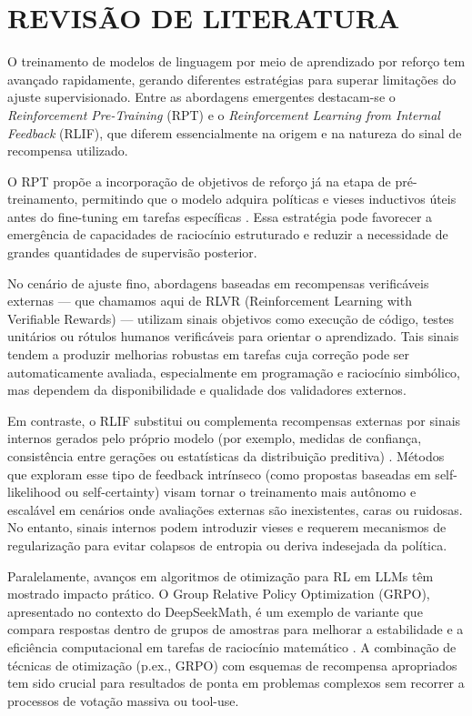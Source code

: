 \documentclass[11pt,a4paper]{article}
\begin{document}
\section{REVISÃO DE LITERATURA}

O treinamento de modelos de linguagem por meio de aprendizado por reforço tem avançado rapidamente, gerando diferentes estratégias para superar limitações do ajuste supervisionado. Entre as abordagens emergentes destacam-se o \textit{Reinforcement Pre-Training} (RPT) e o \textit{Reinforcement Learning from Internal Feedback} (RLIF), que diferem essencialmente na origem e na natureza do sinal de recompensa utilizado.

O RPT propõe a incorporação de objetivos de reforço já na etapa de pré-treinamento, permitindo que o modelo adquira políticas e vieses inductivos úteis antes do fine-tuning em tarefas específicas \cite{dong2025rpt}. Essa estratégia pode favorecer a emergência de capacidades de raciocínio estruturado e reduzir a necessidade de grandes quantidades de supervisão posterior.

No cenário de ajuste fino, abordagens baseadas em recompensas verificáveis externas — que chamamos aqui de RLVR (Reinforcement Learning with Verifiable Rewards) — utilizam sinais objetivos como execução de código, testes unitários ou rótulos humanos verificáveis para orientar o aprendizado. Tais sinais tendem a produzir melhorias robustas em tarefas cuja correção pode ser automaticamente avaliada, especialmente em programação e raciocínio simbólico, mas dependem da disponibilidade e qualidade dos validadores externos.

Em contraste, o RLIF substitui ou complementa recompensas externas por sinais internos gerados pelo próprio modelo (por exemplo, medidas de confiança, consistência entre gerações ou estatísticas da distribuição preditiva) \cite{zhao2025rlif}. Métodos que exploram esse tipo de feedback intrínseco (como propostas baseadas em self-likelihood ou self-certainty) visam tornar o treinamento mais autônomo e escalável em cenários onde avaliações externas são inexistentes, caras ou ruidosas. No entanto, sinais internos podem introduzir vieses e requerem mecanismos de regularização para evitar colapsos de entropia ou deriva indesejada da política.

Paralelamente, avanços em algoritmos de otimização para RL em LLMs têm mostrado impacto prático. O Group Relative Policy Optimization (GRPO), apresentado no contexto do DeepSeekMath, é um exemplo de variante que compara respostas dentro de grupos de amostras para melhorar a estabilidade e a eficiência computacional em tarefas de raciocínio matemático \cite{shao2024deepseekmath}. A combinação de técnicas de otimização (p.ex., GRPO) com esquemas de recompensa apropriados tem sido crucial para resultados de ponta em problemas complexos sem recorrer a processos de votação massiva ou tool-use.
\end{document}
